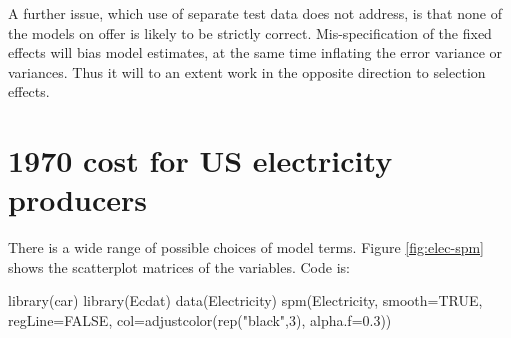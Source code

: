 A further issue, which use of separate test data does not
  address, is that none of the models on offer is likely to be
  strictly correct. Mis-specification of the fixed effects will bias
  model estimates, at the same time inflating the error variance or
  variances.  Thus it will to an extent work in the opposite direction
  to selection effects.

\section{1970 cost for US electricity producers}\label{ss:elec}

There is a wide range of possible choices of model terms.
Figure \ref{fig:elec-spm} shows the scatterplot matrices of the
variables. Code is:
\begin{Schunk}
\begin{Sinput}
library(car)
library(Ecdat)
data(Electricity)
spm(Electricity, smooth=TRUE, regLine=FALSE,
    col=adjustcolor(rep("black",3), alpha.f=0.3))
\end{Sinput}
\end{Schunk}

